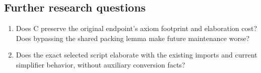 \subsection{Further research questions}
\begin{enumerate}
\item Does C preserve the original endpoint's axiom footprint and elaboration cost? Does bypassing the shared packing lemma make future maintenance worse?
\item Does the exact selected script elaborate with the existing imports and current simplifier behavior, without auxiliary conversion facts?
\end{enumerate}


